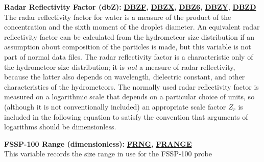 \begin{hangparagraphs}
\textbf{Radar Reflectivity Factor (dbZ): }\textbf{\uline{DBZF}}\textbf{,
}\textbf{\uline{DBZX}}\textbf{,
}\textbf{\uline{DBZ6}}\textbf{,
}\textbf{\uline{DBZY}}, \textbf{\uline{DBZD}}\\
The radar reflectivity factor
for water is a measure of the product of the concentration and the
sixth moment of the droplet diameter. An equivalent radar reflectivity
factor can be calculated from the hydrometeor size distribution if
an assumption about composition of the particles is made, but this
variable is not part of normal data files. The radar reflectivity
factor is a characteristic only of the hydrometeor size distribution;
it is \emph{not }a measure of radar reflectivity, because the latter
also depends on wavelength, dielectric constant, and other characteristics
of the hydrometeors. The normally used radar reflectivity factor is
measured on a logarithmic scale that depends on a particular choice
of units, so (although it is not conventionally included) an appropriate
scale factor $Z_{r}$ is included in the following equation to satisfy
the convention that arguments of logarithms should be dimensionless.
\\



\textbf{FSSP-100 Range (dimensionless): }\textbf{\uline{FRNG}}\textbf{,
}\textbf{\uline{FRANGE}}\\
This variable records the size range in use for the FSSP-100
probe\\



\end{hangparagraphs}
